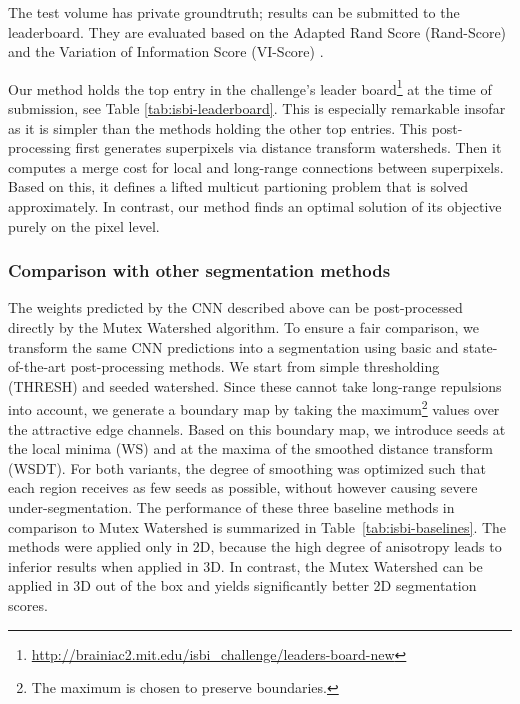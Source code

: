 The test volume has private groundtruth; results can be submitted to the leaderboard.
They are evaluated based on the Adapted Rand Score (Rand-Score) and the Variation of Information Score (VI-Score) \cite{isbi2012challenge}.%

Our method holds the top entry in the challenge's leader board\footnote{{\href{url}{http://brainiac2.mit.edu/isbi\_challenge/leaders-board-new}}} at the time of submission, see Table \ref{tab:isbi-leaderboard}.
This is especially remarkable insofar as it is simpler than the methods holding the other 
top entries.  
This post-processing first generates superpixels via distance transform watersheds.
Then it computes a merge cost for local and long-range connections between superpixels.
Based on this, it defines a lifted multicut partioning problem that is solved approximately.
In contrast, our method finds an optimal solution of its objective purely on the pixel level.





\subsubsection*{Comparison with other segmentation methods}
The weights predicted by the CNN described above can be post-processed directly by the Mutex Watershed algorithm. To ensure a fair comparison, we transform the same CNN predictions into a segmentation using basic and state-of-the-art post-processing methods. 
We start from simple thresholding (THRESH) and seeded watershed. Since these cannot take long-range repulsions into account, we generate a boundary map by taking the maximum\footnote{The maximum is chosen to preserve boundaries.} values over the attractive edge channels. Based on this boundary map, we introduce seeds at the local minima (WS) and at the maxima of the smoothed distance transform (WSDT). For both variants, the degree of smoothing was optimized such that each region receives as few seeds as possible, without however causing severe under-segmentation. The performance of these three baseline methods in comparison to Mutex Watershed is summarized in Table~\ref{tab:isbi-baselines}. The methods were applied only in 2D, because the
high degree of anisotropy leads to inferior results when applied in 3D.
In contrast, the Mutex Watershed can be applied in 3D out of the box and yields significantly better
2D segmentation scores.


